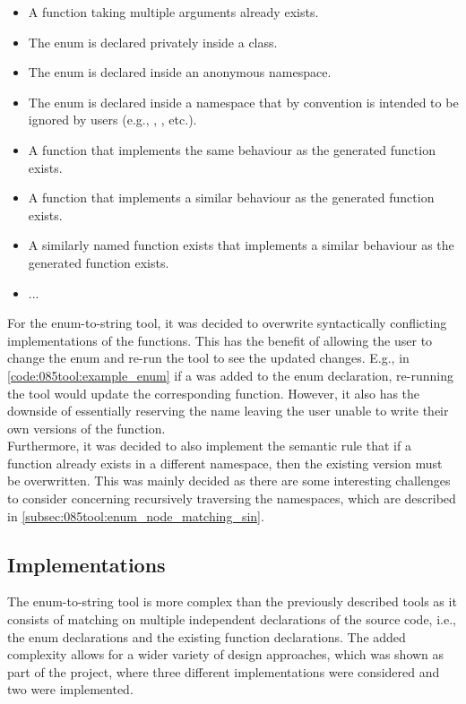 \begin{itemize}
    \vspace{-0.75em}
    \item A  function taking multiple arguments already exists.
    \item The enum is declared privately inside a class.
    \item The enum is declared inside an anonymous namespace.
    \item The enum is declared inside a namespace that by convention is intended to be ignored by users (e.g., , , etc.).
    \item A function that implements the same behaviour as the generated  function exists.
    \item A function that implements a similar behaviour as the generated  function exists.
    \item A similarly named function exists that implements a similar behaviour as the generated  function exists.
    \item ...
\end{itemize}

For the enum-to-string tool, it was decided to overwrite syntactically conflicting implementations of the  functions.
This has the benefit of allowing the user to change the enum and re-run the tool to see the updated changes. E.g., in \cref{code:085tool:example_enum} if a  was added to the enum declaration, re-running the tool would update the corresponding  function.
However, it also has the downside of essentially reserving the  name leaving the user unable to write their own versions of the function.\\
Furthermore, it was decided to also implement the semantic rule that if a  function already exists in a different namespace, then the existing version must be overwritten. This was mainly decided as there are some interesting challenges to consider concerning recursively traversing the namespaces, which are described in \cref{subsec:085tool:enum_node_matching_sin}.

\subsection{Implementations}
The enum-to-string tool is more complex than the previously described tools as it consists of matching on multiple independent declarations of the source code, i.e., the enum declarations and the existing  function declarations. The added complexity allows for a wider variety of design approaches, which was shown as part of the project, where three different implementations were considered and two were implemented.

